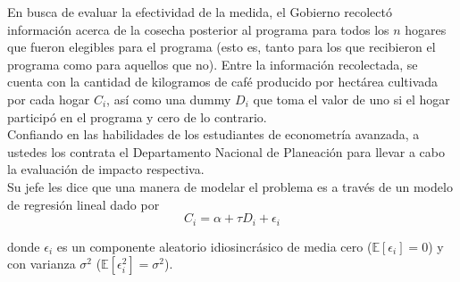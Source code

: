 \documentclass[a4paper]{article}
\begin{document}
En busca de evaluar la efectividad de la medida, el Gobierno recolectó información acerca de la cosecha posterior al programa para todos los $n$ hogares que fueron elegibles para el programa (esto es, tanto para los que recibieron el programa como para aquellos que no). Entre la información recolectada, se cuenta con la cantidad de kilogramos de café producido por hectárea cultivada por cada hogar $C_i$, así como una dummy $D_i$ que toma el valor de uno si el hogar participó en el programa y cero de lo contrario.\\

Confiando en las habilidades de los estudiantes de econometría avanzada, a ustedes los contrata el Departamento Nacional de Planeación para llevar a cabo la evaluación de impacto respectiva.\\

Su jefe les dice que una manera de modelar el problema es a través de un modelo de regresión lineal dado por
\begin{equation} \label{eq: ref}
C_i=\alpha+\tau D_i+\epsilon_i    
\end{equation} 
   
    
    donde $\epsilon_i$ es un componente aleatorio idiosincrásico de media cero ($\mathbb{E}[\epsilon_i]=0$) y con varianza $\sigma^2$ ($\mathbb{E}[\epsilon^2_i]=\sigma^2$).\\
\end{document}

